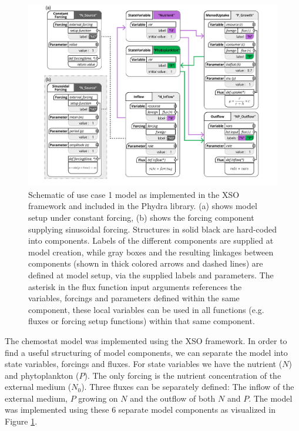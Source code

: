 \documentclass[journal abbreviation, manuscript]{copernicus}
\begin{document}
\begin{figure}[t]
\includegraphics[width=15cm]{Figures/firstdraft_schematics/code_schematics/Chemostat.pdf}
\caption{Schematic of use case 1 model as implemented in the XSO framework and included in the Phydra library. (a) shows model setup under constant forcing, (b) shows the forcing component supplying sinusoidal forcing. Structures in solid black are hard-coded into components. Labels of the different components are supplied at model creation, while gray boxes and the resulting linkages between components (shown in thick colored arrows and dashed lines) are defined at model setup, via the supplied labels and parameters. The asterisk in the flux function input arguments references the variables, forcings and parameters defined within the same component, these local variables can be used in all functions (e.g. fluxes or forcing setup functions) within that same component.}
\label{Figure:CodeSchematics_1}
\end{figure}

The chemostat model was implemented using the XSO framework. In order to find a useful structuring of model components, we can separate the model into state variables, forcings and fluxes. For state variables we have the nutrient ($N$) and phytoplankton ($P$). The only forcing is the nutrient concentration of the external medium ($N_0$). Three fluxes can be separately defined: The inflow of the external medium, $P$ growing on $N$ and the outflow of both $N$ and $P$.
The model was implemented using these 6 separate model components as visualized in Figure \ref{Figure:CodeSchematics_1}.
\end{document}
